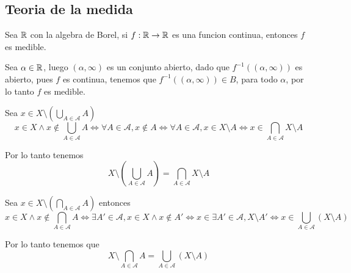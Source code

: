 \documentclass[../main.tex]{subfiles}
\begin{document}
\subsection{Teoria de la medida}
\begin{problem}
  Sea $\mathbb{R}$ con la algebra de Borel, si $f : \mathbb{R} \to \mathbb{R}$ es una funcion continua, entonces $f$ es medible.
\end{problem}
\begin{solution}
  Sea $\alpha \in \mathbb{R}$, luego $(\alpha, \infty)$ es un conjunto abierto, dado que $f^{-1}((\alpha, \infty))$ es abierto, pues $f$ es continua, tenemos que $f^{-1}((\alpha, \infty)) \in B$, para todo $\alpha$, por lo tanto $f$ es medible.
\end{solution}

\begin{solution}
Sea $x \in X \setminus (\bigcup_{A \in \mathcal{A}} A)$
\begin{equation*}
  x \in X \land x \notin \bigcup_{A \in \mathcal{A}} A \iff \forall A \in \mathcal{A}, x \notin A \iff \forall A \in \mathcal{A}, x \in X \setminus A \iff x \in \bigcap_{A \in \mathcal{A}} X \setminus A
\end{equation*}

Por lo tanto tenemos
\begin{equation*}
  X \setminus (\bigcup_{A \in \mathcal{A}} A) = \bigcap_{A \in \mathcal{A}} X \setminus A
\end{equation*}
\end{solution}

\begin{solution}
  Sea $x \in X \setminus (\bigcap_{A \in \mathcal{A}} A)$ entonces
  \begin{equation*}
    x \in X \land x \notin \bigcap_{A \in \mathcal{A}} A \iff \exists A' \in \mathcal{A}, x \in X \land x \notin A' \iff x \in \exists A' \in \mathcal{A}, X \setminus A' \iff x \in \bigcup_{A \in \mathcal{A}} (X \setminus A)
  \end{equation*}

  Por lo tanto tenemos que
  \begin{equation*}
    X \setminus \bigcap_{A \in \mathcal{A}} A = \bigcup_{A \in \mathcal{A}} (X \setminus A)
  \end{equation*}
\end{solution}
\end{document}
